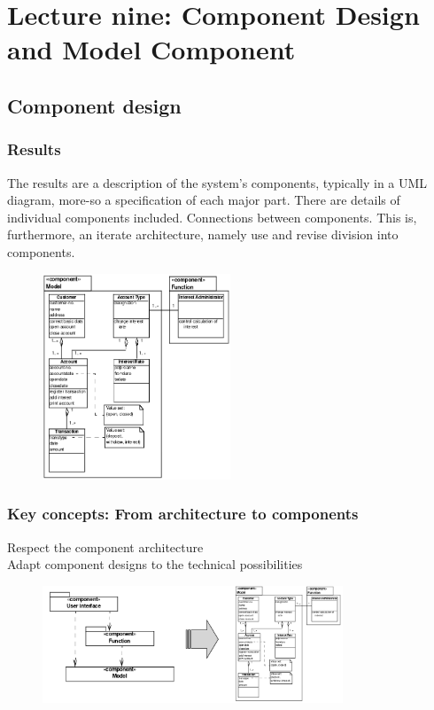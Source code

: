 \chapter{Lecture nine: Component Design and Model Component}
\section{Component design}
\subsection{Results}
The results are a description of the system's components, typically in a UML diagram, more-so a specification of each major part. There are details of individual components included. Connections between components. This is, furthermore, an iterate architecture, namely use and revise division into components.

\begin{figure}[H]
    \centering
    \includegraphics[width=0.5\textwidth]{figures/componentdesignresults.png}
\end{figure}

\subsection{Key concepts: From architecture to components}
\begin{center}
    Respect the component architecture \\
    Adapt component designs to the technical possibilities
\end{center}
\begin{figure}[H]
    \centering
    \includegraphics[width=0.8\textwidth]{figures/componentdesignfromarchtocomponents.png}
\end{figure}

